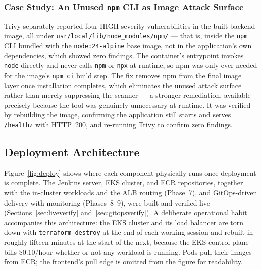 \documentclass[11pt,a4paper]{article}
\begin{document}
\subsubsection{Case Study: An Unused \texttt{npm} CLI as Image Attack Surface}
Trivy separately reported four HIGH-severity vulnerabilities in the built
backend image, all under \texttt{usr/local/lib/node\_modules/npm/} --- that
is, inside the \texttt{npm} CLI bundled with the \texttt{node:24-alpine}
base image, not in the application's own dependencies, which showed zero
findings. The container's entrypoint invokes \texttt{node} directly and
never calls \texttt{npm} or \texttt{npx} at runtime, so npm was only ever
needed for the image's \texttt{npm ci} build step. The fix removes npm from
the final image layer once installation completes, which eliminates the
unused attack surface rather than merely suppressing the scanner --- a
stronger remediation, available precisely because the tool was genuinely
unnecessary at runtime. It was verified by rebuilding the image, confirming
the application still starts and serves \texttt{/healthz} with HTTP~200,
and re-running Trivy to confirm zero findings.

\subsection{Deployment Architecture}
Figure~\ref{fig:deploy} shows where each component physically runs once
deployment is complete. The Jenkins server, EKS cluster, and ECR
repositories, together with the in-cluster workloads and the ALB routing
(Phase~7), and GitOps-driven delivery with monitoring (Phases~8--9), were built
and verified live (Sections~\ref{sec:liveverify} and~\ref{sec:gitopsverify}).
A deliberate operational habit accompanies this
architecture: the EKS cluster and its load
balancer are torn down with \texttt{terraform destroy} at the end of each
working session and rebuilt in roughly fifteen minutes at the start of the
next, because the EKS control plane bills \$0.10/hour whether or not any
workload is running. Pods pull their images from ECR; the frontend's pull
edge is omitted from the figure for readability.
\end{document}
